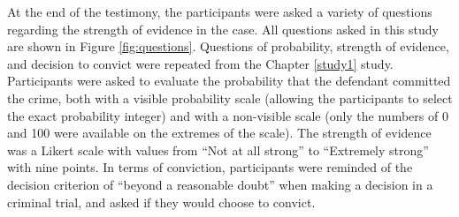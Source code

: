 \documentclass[print]{nuthesis}
\begin{document}
At the end of the testimony, the participants were asked a variety of questions regarding the strength of evidence in the case.
All questions asked in this study are shown in Figure \ref{fig:questions}.
Questions of probability, strength of evidence, and decision to convict were repeated from the Chapter \ref{study1} study.
Participants were asked to evaluate the probability that the defendant committed the crime, both with a visible probability scale (allowing the participants to select the exact probability integer) and with a non-visible scale (only the numbers of 0 and 100 were available on the extremes of the scale).
The strength of evidence was a Likert scale with values from ``Not at all strong'' to ``Extremely strong'' with nine points.
In terms of conviction, participants were reminded of the decision criterion of ``beyond a reasonable doubt'' when making a decision in a criminal trial, and asked if they would choose to convict.
\end{document}
